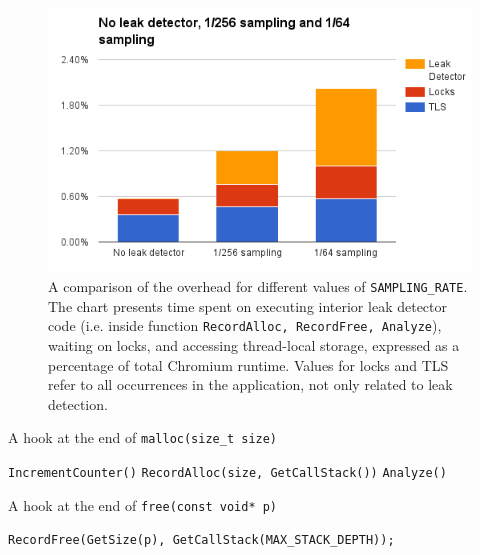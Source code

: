 \documentclass[preprint, numbers]{sigplanconf}
\newcommand{\comment}[1]{{\color{blue}{#1}}}
\begin{document}
\begin{figure}
\centering
\includegraphics[scale=0.45]{overhead}
	\caption{A comparison of the overhead for different values of \texttt{SAMPLING\_RATE}.
	The chart presents time spent on executing interior leak detector code (i.e. inside
	function \texttt{RecordAlloc, RecordFree, Analyze}), waiting on locks, and accessing
	thread-local storage, expressed as a percentage of total Chromium runtime.
	Values for locks and TLS refer to all occurrences in the application, not only related to leak detection.
	\comment{We should elaborate on how this was measured.}
	}
\label{fig:overhead}
\end{figure}

\begin{algorithm}
	\caption{A hook at the end of \texttt{malloc(size\_t size)}}
\begin{algorithmic}[1]
	\State \texttt{IncrementCounter()}
		\Return
	\EndIf
	\State \texttt{RecordAlloc(size, GetCallStack())}
		\State \texttt{Analyze()}
	\EndIf
\EndFunction
\end{algorithmic}
\label{alg:alloc-hook}
\end{algorithm}

\begin{algorithm}
	\caption{A hook at the end of \texttt{free(const void* p)}}
\begin{algorithmic}[1]
		\Return
	\EndIf
	\State \texttt{RecordFree(GetSize(p), GetCallStack(MAX\_STACK\_DEPTH));}
\EndFunction
\end{algorithmic}
\label{alg:free-hook}
\end{algorithm}
\end{document}
